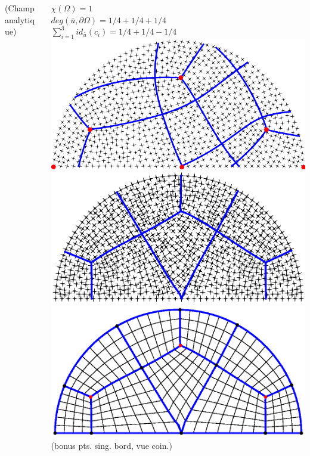 \documentclass[compress,10pt,aspectratio=169]{beamer}
\begin{document}
\begin{frame}
\begin{columns}
\begin{column}{0.4\textwidth}
    \scriptsize {\color{onera_gray}(Champ analytique)}
\end{column}
\pause
\begin{column}{0.4\textwidth}
    \centering
    \scriptsize
    $\chi(\Omega)=1$\\\vspace{0.1cm}
    $deg(\bar{u}, \partial\Omega) = 1/4+1/4+1/4$\\\vspace{0.1cm}
    $\sum_{i=1}^{3} id_{\bar{u}}(c_i)=1/4+1/4-1/4$\\\vspace{0.1cm}
    \includegraphics[scale=0.32]{images/demiDiscTroisPointNonAligne.pdf}\\\vspace{0.1cm}
    \includegraphics[scale=0.32]{images/demiDIscTroisPointAligne.eps}\\\vspace{0.1cm}
    \includegraphics[scale=0.32]{images/mesh_quad_3.eps}\\
    \scriptsize {\color{onera_gray}(bonus pts. sing. bord, vue coin.)}
\end{column}
\end{columns}
\end{frame}
\end{document}
